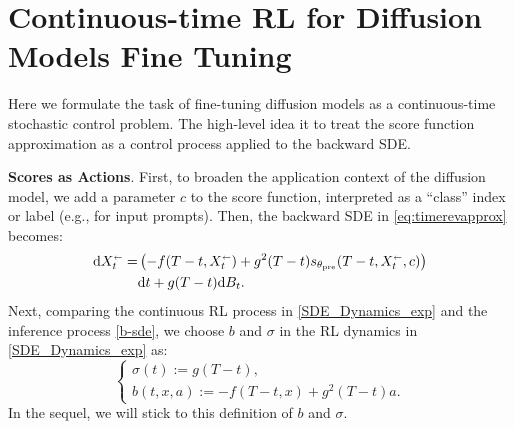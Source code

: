 \documentclass{article}
\theoremstyle{plain}
\theoremstyle{definition}
\theoremstyle{remark}
\newcommand\sla{\scaleobj{0.8}{\leftarrow}}
\begin{document}
%

\section{Continuous-time RL for Diffusion Models Fine Tuning}
\label{sc3}
Here we formulate the task of fine-tuning diffusion models as a continuous-time stochastic control problem.
The high-level idea it to treat the score function approximation as a control process applied to the backward SDE.

\textbf{Scores as Actions}. 
First, to broaden the application context of the diffusion model,
 we add a parameter $c$ to the score function, 
interpreted as a ``class'' index or label (e.g., for input prompts).
Then, the backward SDE in \eqref{eq:timerevapprox} becomes:
\begin{align}
\label{b-sde}
\mathrm{d} X^{\sla}_t = &\left(-f(T-t,X^{\sla}_t) + g^2(T-t) s_{\theta_{\text{pre}}}(T-t, X^{\sla}_t,c  )\right) \nonumber\\
&\mathrm{d}t + g(T-t) \mathrm{d}B_t.
\end{align}
Next, comparing the continuous RL process in \eqref{SDE_Dynamics_exp} and the inference process \eqref{b-sde}, 
we choose $b$ and $\sigma$ in the RL dynamics in \eqref{SDE_Dynamics_exp} as:
\begin{equation}
\label{drift and diffusion coefficient definition}
\left\{
\begin{array}{ll}
    \sigma(t) := g(T-t), \\[8pt]
    b\left(t, x, a\right) := -f(T-t,x) + g^2(T-t) a.
\end{array}
\right.
\end{equation}
In the sequel, we will stick to this definition of $b$ and $\sigma$.
\end{document}
